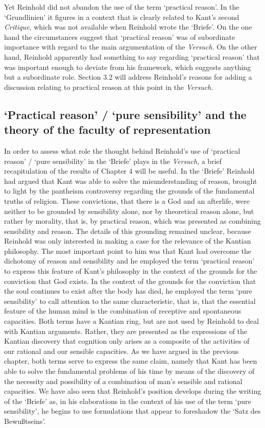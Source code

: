 Yet Reinhold did not abandon the use of the term `practical reason'. In the `Grundlinien' it figures in a context that is clearly related to Kant's second \textit{Critique}, which was not available when Reinhold wrote the `Briefe'. On the one hand the circumstances suggest that `practical reason' was of subordinate importance with regard to the main argumentation of the \textit{Versuch}. On the other hand, Reinhold apparently had something to say regarding `practical reason' that was important enough to deviate from his framework, which suggests anything but a subordinate role. Section 3.2 will address Reinhold's reasons for adding a discussion relating to practical reason at this point in the \textit{Versuch}. 


\subsection{`Practical reason' / `pure sensibility' and the theory of the faculty of representation}


In order to assess what role the thought behind Reinhold's use of `practical reason' / `pure sensibility' in the `Briefe' plays in the \textit{Versuch}, a brief recapitulation of the results of Chapter 4 will be useful. In the `Briefe' Reinhold had argued that Kant was able to solve the misunderstanding of reason, brought to light by the pantheism controversy regarding the grounds of the fundamental truths of religion. These convictions, that there is a God and an afterlife, were neither to be grounded by sensibility alone, nor by theoretical reason alone, but rather by morality, that is, by practical reason, which was presented as combining sensibility and reason. The details of this grounding remained unclear, because Reinhold was only interested in making a case for the relevance of the Kantian philosophy. The most important point to him was that Kant had overcome the dichotomy of reason and sensibility and he employed the term `practical reason' to express this feature of Kant's philosophy in the context of the grounds for the conviction that God exists. In the context of the grounds for the conviction that the soul continues to exist after the body has died, he employed the term `pure sensibility' to call attention to the same characteristic, that is, that the essential feature of the human mind is the combination of receptive and spontaneous capacities. Both terms have a Kantian ring, but are not used by Reinhold to deal with Kantian arguments. Rather, they are presented as the expressions of the Kantian discovery that cognition only arises as a composite of the activities of our rational and our sensible capacities. As we have argued in the previous chapter, both terms serve to express the same claim, namely that Kant has been able to solve the fundamental problems of his time by means of the discovery of the necessity and possibility of a combination of man's sensible and rational capacities. We have also seen that Reinhold's position develops during the writing of the `Briefe' as, in his elaborations in the context of his use of the term `pure sensibility', he begins to use formulations that appear to foreshadow the `Satz des Bewu\ss{}tseins'. 


